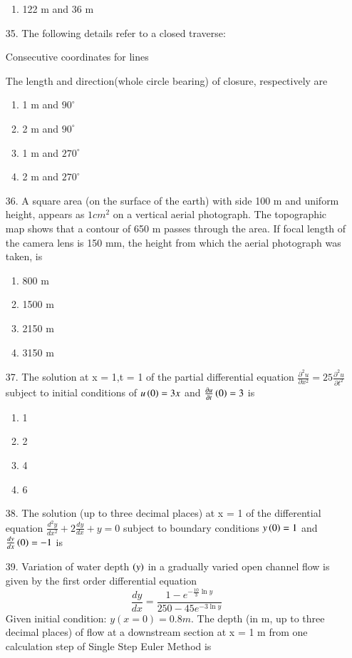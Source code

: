 \documentclass[journal]{IEEEtran}
\begin{document}
\begin{enumerate}
\begin{enumerate}[label=(\Alph*)]
        \item 122 m and 36 m  
    \end{enumerate}
    \item[35.]The following details refer to a closed traverse:
    \begin{table}[h!]
        \centering
        
        \caption{Consecutive coordinates for lines}
    \end{table}
    The length and direction(whole circle bearing) of closure, respectively are 
    \begin{enumerate}[label=(\Alph*)]
        \item 1 m and $90^{\circ}$
        \item 2 m and $90^{\circ}$
        \item 1 m and $270^{\circ}$
        \item 2 m and $270^{\circ}$
    \end{enumerate}
    \item[36.] A square area (on the surface of the earth) with side 100 m and uniform height, appears as
    $1 cm^2$ on a vertical aerial photograph. The topographic map shows that a contour of 650 m
    passes through the area. If focal length of the camera lens is 150 mm, the height from
    which the aerial photograph was taken, is
    \begin{enumerate}[label=(\Alph*)]
        \item 800 m 
        \item 1500 m 
        \item 2150 m 
        \item 3150 m 
    \end{enumerate}
    \item[37.]The solution at x = 1,t = 1 of the partial differential equation $\frac{\partial ^2 u}{\partial x^2} = 25\frac{\partial^2u}{\partial t^2}$ subject to initial conditions of $u\left(0\right) = 3x$ and $\frac{\partial u}{\partial t}\left(0\right)=3$ is 
    \begin{enumerate}[label=(\Alph*)]
        \item 1
        \item 2
        \item 4
        \item 6
    \end{enumerate}
    \item[38.] The solution (up to three decimal places) at x = 1 of the differential equation $\frac{d^2y}{dx^2}+2\frac{dy}{dx}+y=0$ subject to boundary conditions $y\left(0\right)=1$ and $\frac{dy}{dx}\left(0\right) = -1$ is 
    \item[39.] Variation of water depth $\left(y\right)$ in a gradually varied open channel flow is given by the first
    order differential equation $$\frac{dy}{dx} = \frac{1-e^{-\frac{10}{3}\ln y}}{250-45e^{-3\ln y}}$$Given initial condition: $y(x = 0) = 0.8 m$. The depth (in m, up to three decimal places) of
    flow at a downstream section at x = 1 m from one calculation step of Single Step Euler
    Method is 
     
\end{enumerate}
\end{document}
